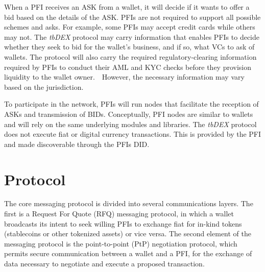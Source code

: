 \documentclass[11pt]{article}
\begin{document}
\vspace{1\baselineskip}
When a PFI receives an ASK from a wallet, it will decide if it wants to offer a bid based on the details of the ASK. PFIs are not required to support all possible schemes and asks.  For example, some PFIs may accept credit cards while others may not.  The \textit{tbDEX }protocol may carry information that enables PFIs to decide whether they seek to bid for the wallet’s business, and if so, what VCs to ask of wallets.  The protocol will also carry the required regulatory-clearing information required by PFIs to conduct their AML and KYC checks before they provision liquidity to the wallet owner.\ \ However, the necessary information may vary based on the jurisdiction. 

\vspace{1\baselineskip}
To participate in the network, PFIs will run nodes that facilitate the reception of ASKs and transmission of BIDs. Conceptually, PFI nodes are similar to wallets and will rely on the same underlying modules and libraries. The \textit{tbDEX }protocol does not execute fiat or digital currency transactions. This is provided by the PFI and made discoverable through the PFIs DID.  

\vspace{1\baselineskip}
\section{Protocol}

\vspace{1\baselineskip}
The core messaging protocol is divided into several communications layers. The first is a Request For Quote (RFQ) messaging protocol, in which a wallet broadcasts its intent to seek willing PFIs to exchange fiat for in-kind tokens (stablecoins or other tokenized assets) or vice versa. The second element of the messaging protocol is the point-to-point (PtP) negotiation protocol, which permits secure communication between a wallet and a PFI, for the exchange of data necessary to negotiate and execute a proposed transaction.  
\end{document}
